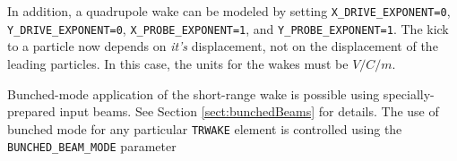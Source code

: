 In addition, a quadrupole wake can be modeled by setting {\tt X\_DRIVE\_EXPONENT=0}, {\tt
Y\_DRIVE\_EXPONENT=0}, {\tt X\_PROBE\_EXPONENT=1}, and {\tt Y\_PROBE\_EXPONENT=1}.
The kick to a particle now depends on {\em it's} displacement, not on the displacement of
the leading particles.
In this case, the units for the wakes must be $V/C/m$.

Bunched-mode application of the short-range wake is possible using specially-prepared input
beams. 
See Section \ref{sect:bunchedBeams} for details.
The use of bunched mode for any particular \verb|TRWAKE| element is controlled using the \verb|BUNCHED_BEAM_MODE| parameter
